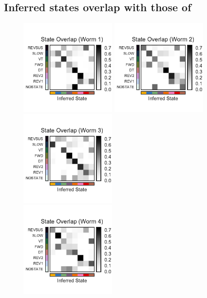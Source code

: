 \documentclass{article}
\begin{document}
\clearpage

\subsection{Inferred states overlap with those of~\citet{kato2015global}}


\begin{figure}[h]
\centering%
\includegraphics[width=1.9in]{figures/arhmm/overlap_0.pdf}
\includegraphics[width=1.9in]{figures/arhmm/overlap_1.pdf}
\includegraphics[width=1.9in]{figures/arhmm/overlap_2.pdf}
\\
\includegraphics[width=1.9in]{figures/arhmm/overlap_3.pdf}

\end{figure}
\end{document}
